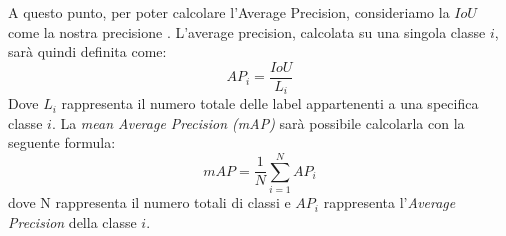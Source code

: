 A questo punto, per poter calcolare l'Average Precision, consideriamo la 
$IoU$ come la nostra precisione \cite{rosebrock2017deep}. L'average precision, calcolata su una 
singola classe $i$, sarà quindi definita come:
\begin{equation}\label{average precision}
    AP_i = \frac{IoU}{L_i}
\end{equation}
Dove $L_i$ rappresenta il numero totale delle label appartenenti a una specifica 
classe $i$. La \emph{mean Average Precision (mAP)} sarà possibile calcolarla con la 
seguente formula:
\begin{equation}\label{mean average precision}
    mAP = \frac{1}{N}\sum_{i=1}^NAP_i
\end{equation}
dove N rappresenta il numero totali di classi e $AP_i$ rappresenta l'\emph{Average 
Precision} della classe $i$.

